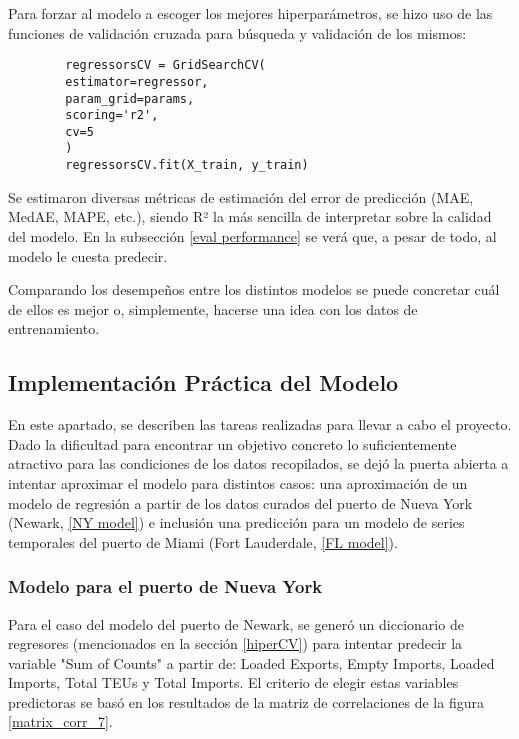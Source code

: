 \documentclass[12pt]{article}
\begin{document}
	Para forzar al modelo a escoger los mejores hiperparámetros, se hizo uso de las funciones de validación cruzada para búsqueda y validación de los mismos:
	
	\begin{verbatim}
		regressorsCV = GridSearchCV(
		estimator=regressor,
		param_grid=params,
		scoring='r2',
		cv=5
		)
		regressorsCV.fit(X_train, y_train)
	\end{verbatim}

	Se estimaron diversas métricas de estimación del error de predicción (MAE, MedAE, MAPE, etc.), siendo R² la más sencilla de interpretar sobre la calidad del modelo. En la subsección \ref{eval performance} se verá que, a pesar de todo, al modelo le cuesta predecir.
	
	Comparando los desempeños entre los distintos modelos se puede concretar cuál de ellos es mejor o, simplemente, hacerse una idea con los datos de entrenamiento.
	
	\subsection{\label{implementacionPractica}Implementación Práctica del Modelo}
 	En este apartado, se describen las tareas realizadas para llevar a cabo el proyecto. Dado la dificultad para encontrar un objetivo concreto lo suficientemente atractivo para las condiciones de los datos recopilados, se dejó la puerta abierta a intentar aproximar el modelo para distintos casos: una aproximación de un modelo de regresión a partir de los datos curados del puerto de Nueva York (Newark, \ref{NY model}) e inclusión una predicción para un modelo de series temporales del puerto de Miami (Fort Lauderdale, \ref{FL model}).
 	
 	\subsubsection{\label{NY model} Modelo para el puerto de Nueva York}
 	Para el caso del modelo del puerto de Newark, se generó un diccionario de regresores (mencionados en la sección \ref{hiperCV}) para intentar predecir la variable "Sum of Counts" a partir de: Loaded Exports, Empty Imports, Loaded Imports, Total TEUs y Total Imports. El criterio de elegir estas variables predictoras se basó en los resultados de la matriz de correlaciones de la figura \ref{matrix_corr_7}.
 	
\end{document}

